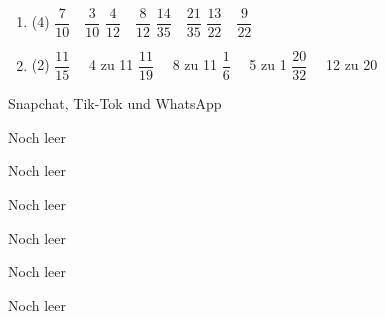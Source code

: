 \documentclass[12pt,a5paper,landscape]{scrartcl}
\begin{document}
	\begin{loesungskarte}
		\begin{enumerate}
			\vspace{1cm}
			\item\begin{tasks}(4)
					\task $\dfrac{7}{10}\quad\dfrac{3}{10}$
					\task $\dfrac{4}{12}\quad\dfrac{8}{12}$
					\task $\dfrac{14}{35}\quad\dfrac{21}{35}$
					\task $\dfrac{13}{22}\quad\dfrac{9}{22}$
				\end{tasks}
			
			\vspace{1cm}
			\item\begin{tasks}(2)
					\task $\dfrac{11}{15}\quad$ 4 zu 11
					\task $\dfrac{11}{19}\quad$ 8 zu 11
					\task $\dfrac{1}{6}\quad$ 5 zu 1
					\task $\dfrac{20}{32}\quad$ 12 zu 20 
				\end{tasks}
		\end{enumerate}
	\end{loesungskarte}
	
	\begin{karte3}{Snapchat, Tik-Tok und WhatsApp}
		
	\end{karte3}

	\begin{loesungskarte}
		
	\end{loesungskarte}
		
	\begin{karte1}{Noch leer}
	\end{karte1}
	
	\begin{karte1}{Noch leer}
	\end{karte1}
	
	\begin{karte1}{Noch leer}
	\end{karte1}
	
	\begin{karte1}{Noch leer}
	\end{karte1}
		
	\begin{karte1}{Noch leer}
	\end{karte1}
	
	\begin{karte1}{Noch leer}
	\end{karte1}
	
\end{document}
